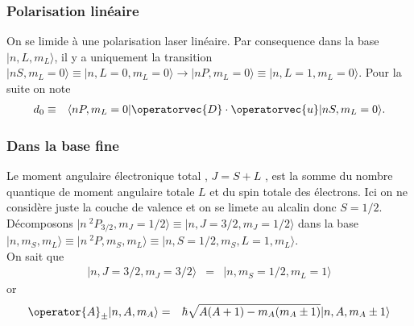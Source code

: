 \subsubsection{Polarisation linéaire}

On se limide à une polarisation laser linéaire. Par consequence dans la base $\vert  n , L , m_L \rangle$, il y a uniquement la transition $\vert n S , m_L = 0 \rangle \equiv \vert n , L = 0 , m_L = 0 \rangle \to \vert n P , m_L = 0 \rangle \equiv \vert n , L = 1 , m_L = 0 \rangle $.
Pour la suite on note %
\begin{eqnarray*}
	d_0 & \equiv & \langle nP , m_L = 0 \vert \operatorvec{D} \cdot \operatorvec{u} \vert nS , m_L = 0 \rangle.	
\end{eqnarray*}


\subsubsection{Dans la base fine}

Le moment angulaire électronique total , $J = S + L$ , est la somme du nombre quantique de moment angulaire totale $L$ et du spin totale des électrons. Ici on ne considère juste la couche de valence et on se limete au alcalin donc $S = 1/2 $.\\

Décomposons $\vert n{~}^2P_{3/2} , m_J = 1/2 \rangle \equiv \vert n , J = 3/2 , m_J = 1/2 \rangle $ dans la base  $  \vert n , m_S  , m_L \rangle  \equiv \vert  n{~}^2P , m_S  ,  m_L \rangle \equiv \vert n  , S=1/2 , m_S , L=1 , m_L \rangle $.\\
On sait que 
\begin{eqnarray}
	\vert n , J = {3}/{2} , m_J = {3}/{2} \rangle & = &  \vert n , m_S = 1/2   , m_L = 1 \rangle
\end{eqnarray}
or
\begin{eqnarray}
	\operator{A}_\pm \vert n , A , m	_A \rangle & = & \hbar \sqrt{A(A+1) - m_A(m_A\pm 1 ) } \vert n , A , m	_A \pm 1  \rangle
\end{eqnarray}

